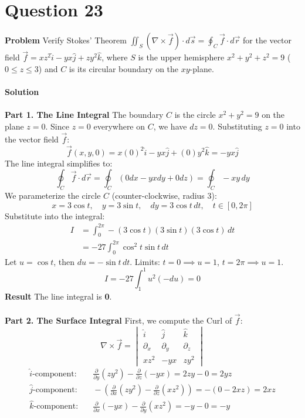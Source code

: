 \documentclass{article}
\begin{document}
\pagebreak


\section{Question 23}
\textbf{Problem}
Verify Stokes' Theorem
$\iint_S (\nabla \times \vec{f}) \cdot d\vec{s} = \oint_C \vec{f} \cdot d\vec{r}$
for the vector field $\vec{f} = xz^2\hat{i} - yx\hat{j} + zy^2\hat{k}$, where $S$
is the upper hemisphere $x^2 + y^2 + z^2 = 9$ ($0 \le z \le 3$) and $C$ is its
circular boundary on the $xy$-plane.
\\
\\
\textbf{Solution}
\\
\\
\textbf{Part 1. The Line Integral}
The boundary $C$ is the circle $x^2 + y^2 = 9$ on the plane $z=0$.
Since $z=0$ everywhere on $C$, we have $dz=0$.
Substituting $z=0$ into the vector field $\vec{f}$:
\[
	\vec{f}(x,y,0) = x(0)^2\hat{i} - yx\hat{j} + (0)y^2\hat{k} = -yx\hat{j}
\]
The line integral simplifies to:
\[
	\oint_C \vec{f} \cdot d\vec{r} = \oint_C (0 dx - yx dy + 0 dz) = \oint_C -xy \, dy
\]
We parameterize the circle $C$ (counter-clockwise, radius 3):
\[
	x = 3\cos t, \quad y = 3\sin t, \quad dy = 3\cos t \, dt, \quad t \in [0, 2\pi]
\]
Substitute into the integral:
\begin{align*}
	I & = \int_0^{2\pi} -(3\cos t)(3\sin t)(3\cos t) \, dt \\
	  & = -27 \int_0^{2\pi} \cos^2 t \sin t \, dt
\end{align*}
Let $u = \cos t$, then $du = -\sin t \, dt$.
Limits: $t=0 \implies u=1$, $t=2\pi \implies u=1$.
\[
	I = -27 \int_1^1 u^2 (-du) = 0
\]
\textbf{Result} The line integral is \textbf{0}.
\\
\\
\textbf{Part 2. The Surface Integral}
First, we compute the Curl of $\vec{f}$:
\[
	\nabla \times \vec{f} = \begin{vmatrix} \hat{i} & \hat{j} & \hat{k} \\ \partial_x & \partial_y & \partial_z \\ xz^2 & -yx & zy^2 \end{vmatrix}
\]
\begin{align*}
	\text{$\hat{i}$-component:} & \quad \frac{\partial}{\partial y}(zy^2) - \frac{\partial}{\partial z}(-yx) = 2zy - 0 = 2yz                     \\
	\text{$\hat{j}$-component:} & \quad -\left( \frac{\partial}{\partial x}(zy^2) - \frac{\partial}{\partial z}(xz^2) \right) = -(0 - 2xz) = 2xz \\
	\text{$\hat{k}$-component:} & \quad \frac{\partial}{\partial x}(-yx) - \frac{\partial}{\partial y}(xz^2) = -y - 0 = -y
\end{align*}
\end{document}
